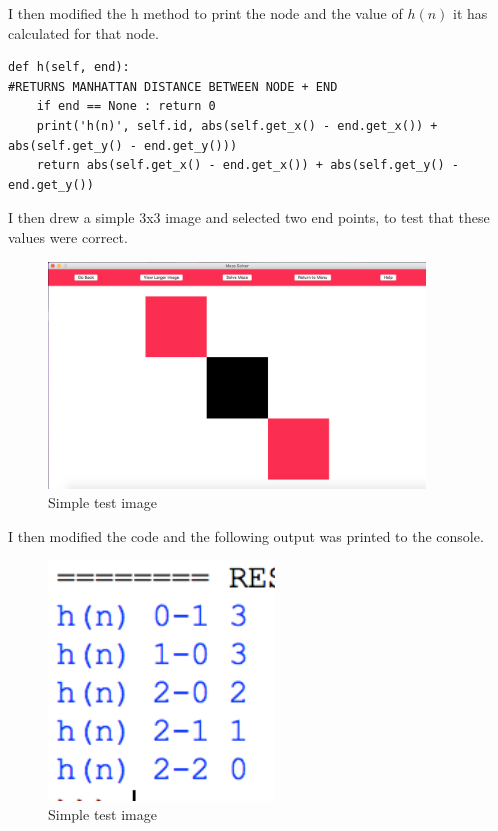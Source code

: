 \documentclass[titlepage]{article}
\begin{document}
I then modified the h method to print the node and the value of $h(n)$ it has calculated for that node.

\begin{changemargin}{-1in}{-1in} 
\begin{verbatim}
def h(self, end):                                                           #RETURNS MANHATTAN DISTANCE BETWEEN NODE + END
    if end == None : return 0
    print('h(n)', self.id, abs(self.get_x() - end.get_x()) + abs(self.get_y() - end.get_y()))
    return abs(self.get_x() - end.get_x()) + abs(self.get_y() - end.get_y())
\end{verbatim}
\end{changemargin} 

I then drew a simple 3x3 image and selected two end points, to test that these values were correct.

\begin{figure}[H]
  \centering
  \includegraphics[width=10cm]{theer.png}
  \caption{Simple test image}
  \label{fig:dijk}
\end{figure}

I then modified the code and the following output was printed to the console.

\begin{figure}[H]
  \centering
  \includegraphics[width=6cm]{con.png}
  \caption{Simple test image}
  \label{fig:dijk}
\end{figure}
\end{document}
